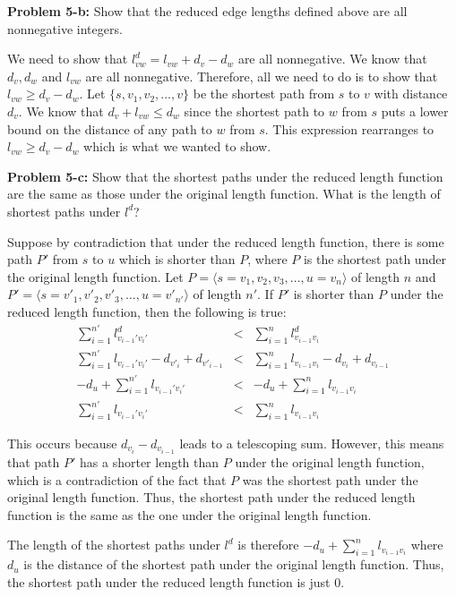 \documentclass[psamsfonts]{amsart}
\newenvironment{sol}{\vspace{0.25cm}{\large \bfseries Solution:}}{\qedsymbol}
\newenvironment{prob}[1]{\begin{framed}{\large \bfseries Problem #1:}}{\end{framed}}
\begin{document}
\begin{prob}{5-b}
Show that the reduced edge lengths defined above are all nonnegative integers.
\end{prob}
\begin{sol}
We need to show that $l_{vw}^d = l_{vw} + d_v - d_w$ are all nonnegative. We know that $d_v, d_w$ and $l_{vw}$ are all nonnegative. Therefore, all we need to do is to show that $l_{vw} \geq d_v - d_w$. Let $\{s, v_1, v_2, \ldots, v\}$ be the shortest path from $s$ to $v$ with distance $d_v$. We know that $d_v + l_{vw} \leq d_{w}$ since the shortest path to $w$ from $s$ puts a lower bound on the distance of any path to $w$ from $s$. This expression rearranges to $l_{vw} \geq d_v - d_w$ which is what we wanted to show.
\end{sol}

\begin{prob}{5-c}
Show that the shortest paths under the reduced length function are the same as those under the original length function. What is the length of shortest paths under $l^d$?
\end{prob}
\begin{sol}
Suppose by contradiction that under the reduced length function, there is some path $P'$ from $s$ to $u$ which is shorter than $P$, where $P$ is the shortest path under the original length function. Let $P = \langle s=v_1, v_2, v_3, \ldots, u=v_n \rangle$ of length $n$ and $P' = \langle s=v'_1, v'_2, v'_3, \ldots, u = v'_{n'}\rangle$ of length $n'$. If $P'$ is shorter than $P$ under the reduced length function, then the following is true:
\begin{eqnarray}
\sum_{i=1}^{n'} l^d_{v_{i-1}' v_{i}'} &<& \sum_{i=1}^n l^d_{v_{i-1} v_i} \\
\sum_{i=1}^{n'} l_{v_{i-1}' v_{i}'} - d_{v'_i} + d_{v'_{i-1}} &<& \sum_{i=1}^{n} l_{v_{i-1} v_{i}} - d_{v_i} + d_{v_{i-1}} \\
-d_{u} + \sum_{i=1}^{n'} l_{v_{i-1}' v_i'} &<& -d_u + \sum_{i=1}^n l_{v_{i-1} v_i} \\
\sum_{i=1}^{n'} l_{v_{i-1}' v_i'} &<& \sum_{i=1}^n l_{v_{i-1} v_i} 
\end{eqnarray}

This occurs because $d_{v_i} - d_{v_{i-1}}$ leads to a telescoping sum. However, this means that path $P'$ has a shorter length than $P$ under the original length function, which is a contradiction of the fact that $P$ was the shortest path under the original length function. Thus, the shortest path under the reduced length function is the same as the one under the original length function.

The length of the shortest paths under $l^d$ is therefore $-d_u + \sum_{i=1}^n l_{v_{i-1} v_{i}}$ where $d_u$ is the distance of the shortest path under the original length function. Thus, the shortest path under the reduced length function is just 0. 
\end{sol}
\end{document}

